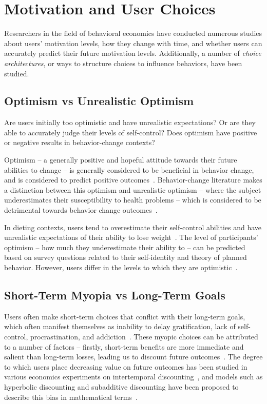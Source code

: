 \section{Motivation and User Choices}

Researchers in the field of behavioral economics have conducted numerous studies about users' motivation levels, how they change with time, and whether users can accurately predict their future motivation levels. Additionally, a number of \textit{choice architectures}, or ways to structure choices to influence behaviors, have been studied.

\subsection{Optimism vs Unrealistic Optimism}
Are users initially too optimistic and have unrealistic expectations? Or are they able to accurately judge their levels of self-control? Does optimism have positive or negative results in behavior-change contexts?

Optimism -- a generally positive and hopeful attitude towards their future abilities to change -- is generally considered to be beneficial in behavior change, and is considered to predict positive outcomes~\cite{davidson1997optimism}. Behavior-change literature makes a distinction between this optimism and unrealistic optimism -- where the subject underestimates their susceptibility to health problems -- which is considered to be detrimental towards behavior change outcomes~\cite{davidson1997optimism}.

In dieting contexts, users tend to overestimate their self-control abilities and have unrealistic expectations of their ability to lose weight~\cite{sparks1995perceived}. The level of participants' optimism -- how much they underestimate their ability to -- can be predicted based on survey questions related to their self-identity and theory of planned behavior. However, users differ in the levels to which they are optimistic~\cite{davidson1997optimism}.


\subsection{Short-Term Myopia vs Long-Term Goals}

Users often make short-term choices that conflict with their long-term goals, which often manifest themselves as inability to delay gratification, lack of self-control, procrastination, and addiction~\cite{loewenstein1992choice, shu2010procrastination}. These myopic choices can be attributed to a number of factors -- firstly, short-term benefits are more immediate and salient than long-term losses, leading us to discount future outcomes~\cite{ainslie2001breakdown, loewenstein1992choice, soman2005psychology}. The degree to which users place decreasing value on future outcomes has been studied in various economics experiments on intertemporal discounting~\cite{weber2007asymmetric}, and models such as hyperbolic discounting and subadditive discounting have been proposed to describe this bias in mathematical terms~\cite{ainslie1992hyperbolic, rubinstein2003economics, read2001time}.

